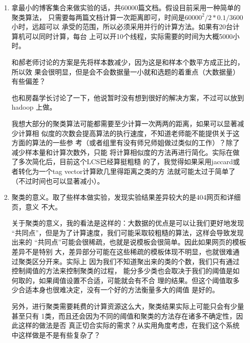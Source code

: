 \documentclass[a4paper]{article}
\begin{document}
\begin{enumerate}
\item 拿最小的博客集合来做实验的话，共60000篇文档。假设目前采用一种简单的聚类算法，
     只需要每两篇文档计算一次距离即可，时间是\(60000^2/2*0.1/3600\)小时，远超可以
     承受的范围，所以必须采用并行的计算方法。如果有20台计算机可以同时计算，每台
     上可以开10个线程，实际需要的时间为大概5000小时。

     和郝老师讨论的方案是先将样本数减少，因为这是和样本个数平方成正比的，所以效
     果会很明显，但是会不会数据量一小就和选题的着重点（大数据量）有些偏差？

     也和房磊学长讨论了一下，他说暂时没有想到很好的解决方案，不过可以放到hadoop
     上做。

     我想大部分的聚类算法可能都需要至少计算一次两两的距离，如果可以显著减少计算相
     似度的次数会提高算法的执行速度，不知道老师能不能提供关于这方面的算法的一些参
     考（或者组里有没有师兄师姐做过类似的工作）？除了减少样本量和计算次数外，只能
     将计算相似度的方法再进行简化。实际在做了多次简化后，目前这个LCS已经算挺粗糙
     的了，我觉得如果采用jaccard或者转化为一个tag vector计算欧几里得距离之类的方
     法就可能太过于简单了（不过时间也可以显著减小）。
\item 聚类的意义。取了些样本做实验，发现实验结果差异较大的是404网页和详细页，意义
     不大。
     
     关于聚类的意义，我的看法是这样的：大数据的优点是可以让我们更好地发现
     “共同点”，但是为了计算速度，我们可能采取较粗糙的算法，这样会导致发现出来的
     “共同点”可能会很稀疏，也就是说模板会很简单。因此如果网页的模板差异不是特别
     大，差异部分可能在这些稀疏的模板体现不明显，也就很难通过聚类区分开来。实际上
     因为我们不知道聚出来的类的个数，我们只有通过控制阈值的方法来控制聚类的过程，
     能分多少类也会取决于我们的阈值是如何取的，如果阈值设置不合适，可能就会有不合
     理的结果。但这个阈值取多少合适本身也很难决定，没有一个好的方法衡量多大的阈值
     是好的。

     另外，进行聚类需要耗费的计算资源这么大，聚类结果实际上可能只会有少量甚至只有
     1类，而且还会因为不同的阈值和聚类的方法存在诸多不确定性，因此这样的做法是否
     真正切合实际的需求？从实用角度考虑，在我们这个系统中这样做是不是有些复杂了？
\end{enumerate}
\end{document}
